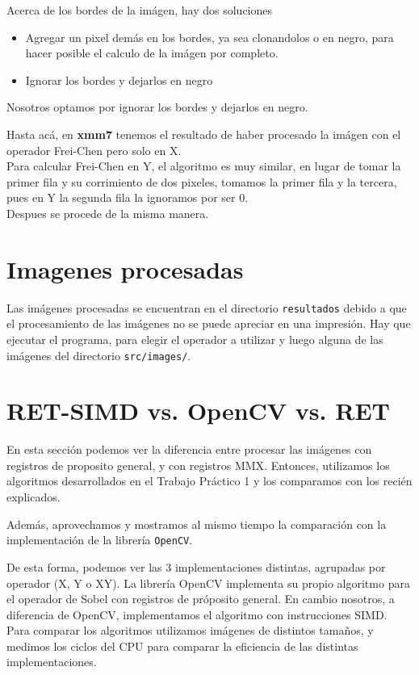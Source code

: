 \documentclass[a4paper, 10pt]{article}
\begin{document}
Acerca de los bordes de la im\'agen, hay dos soluciones 
\begin{itemize}
	\item{Agregar un pixel dem\'as en los bordes, ya sea clonandolos o en negro, para hacer posible el calculo de la im\'agen por completo.}
	\item{Ignorar los bordes y dejarlos en negro}
\end{itemize}


Nosotros optamos por ignorar los bordes y dejarlos en negro.

Hasta ac\'a, en \textbf{xmm7} tenemos el resultado de haber procesado la im\'agen con el operador Frei-Chen pero solo en X. \\

Para calcular Frei-Chen en Y, el algoritmo es muy similar, en lugar de tomar la primer fila y su corrimiento de dos pixeles, tomamos la primer fila y la tercera, pues en Y la segunda fila la ignoramos por ser 0. \\ 

Despues se procede de la misma manera.

\section{Imagenes procesadas}

Las im\'agenes procesadas se encuentran en el directorio \texttt{resultados} debido a que el procesamiento de las im\'agenes no se puede apreciar en una impresi\'on.
Hay que ejecutar el programa, para elegir el operador a utilizar y luego alguna de las im\'agenes del directorio \texttt{src/images/}.


\newpage


\section{RET-SIMD vs. OpenCV vs. RET }
En esta secci\'on podemos ver la diferencia entre procesar las im\'agenes con registros de proposito general, y con registros MMX.
Entonces, utilizamos los algoritmos desarrollados en el Trabajo Pr\'actico 1 y los comparamos con los reci\'en explicados.

Adem\'as, aprovechamos y mostramos al mismo tiempo la comparaci\'on con la implementaci\'on de la librer\'ia \texttt{OpenCV}.

De esta forma, podemos ver las 3 implementaciones distintas, agrupadas por operador (X, Y o XY).
La librer\'ia OpenCV implementa su propio algoritmo para el operador de Sobel con registros de pr\'oposito general.
En cambio nosotros, a diferencia de OpenCV, implementamos el algoritmo con instrucciones SIMD.
Para comparar los algoritmos utilizamos im\'agenes de distintos tama\~nos, y medimos los ciclos del CPU para comparar la eficiencia de las distintas implementaciones.
\end{document}
